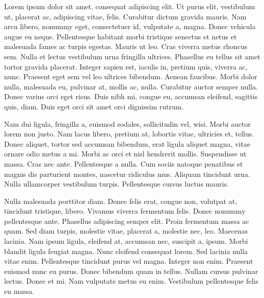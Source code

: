 \begin{spacing}{1.05}

	\vspace{.8mm}

	{\small
		Lorem ipsum dolor sit amet, consequat adipiscing elit. Ut purus
		elit, vestibulum ut, placerat ac, adipiscing vitae, felis. Curabitur
		dictum gravida mauris. Nam arcu libero, nonummy eget, consectetuer
		id, vulputate a, magna. Donec vehicula augue eu neque. Pellentesque
		habitant morbi tristique senectus et netus et malesuada fames ac
		turpis egestas. Mauris ut leo. Cras viverra metus rhoncus sem. Nulla
		et lectus vestibulum urna fringilla ultrices. Phasellus eu tellus
		sit amet tortor gravida placerat. Integer sapien est, iaculis in,
		pretium quis, viverra ac, nunc. Praesent eget sem vel leo ultrices
		bibendum. Aenean faucibus. Morbi dolor nulla, malesuada eu, pulvinar
		at, mollis ac, nulla. Curabitur auctor semper nulla.  Donec varius
		orci eget risus. Duis nibh mi, congue eu, accumsan eleifend,
		sagittis quis, diam. Duis eget orci sit amet orci dignissim rutrum.

		Nam dui ligula, fringilla a, euismod sodales, sollicitudin vel,
		wisi. Morbi auctor lorem non justo. Nam lacus libero, pretium at,
		lobortis vitae, ultricies et, tellus. Donec aliquet, tortor sed
		accumsan bibendum, erat ligula aliquet magna, vitae ornare odio
		metus a mi. Morbi ac orci et nisl hendrerit mollis. Suspendisse ut
		massa. Cras nec ante. Pellentesque a nulla.  Cum sociis natoque
		penatibus et magnis dis parturient montes, nascetur ridiculus
		mus. Aliquam tincidunt urna. Nulla ullamcorper vestibulum
		turpis. Pellentesque cursus luctus mauris.

		Nulla malesuada porttitor diam. Donec felis erat, congue non,
		volutpat at, tincidunt tristique, libero. Vivamus viverra fermentum
		felis. Donec nonummy pellentesque ante. Phasellus adipiscing semper
		elit. Proin fermentum massa ac quam. Sed diam turpis, molestie
		vitae, placerat a, molestie nec, leo. Maecenas lacinia. Nam ipsum
		ligula, eleifend at, accumsan nec, suscipit a, ipsum. Morbi blandit
		ligula feugiat magna. Nunc eleifend consequat lorem. Sed lacinia
		nulla vitae enim. Pellentesque tincidunt purus vel magna. Integer
		non enim. Praesent euismod nunc eu purus.  Donec bibendum quam in
		tellus. Nullam cursus pulvinar lectus. Donec et mi. Nam vulputate
		metus eu enim. Vestibulum pellentesque felis eu massa.
	}

	\vfill

\end{spacing}
